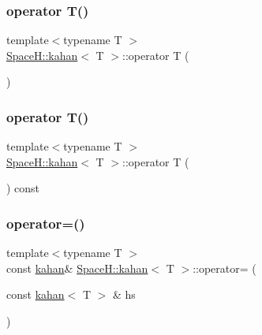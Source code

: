 \subsubsection{\texorpdfstring{operator T()}{operator T()}\hspace{0.1cm}{\footnotesize\ttfamily [1/2]}}
{\footnotesize\ttfamily template$<$typename T $>$ \\
\mbox{\hyperlink{struct_space_h_1_1kahan}{Space\+H\+::kahan}}$<$ T $>$\+::operator T (\begin{DoxyParamCaption}{ }\end{DoxyParamCaption})\hspace{0.3cm}{\ttfamily [inline]}}

\mbox{\label{struct_space_h_1_1kahan_aac0531dd242d8da70ecd34789bc29282}} 
\subsubsection{\texorpdfstring{operator T()}{operator T()}\hspace{0.1cm}{\footnotesize\ttfamily [2/2]}}
{\footnotesize\ttfamily template$<$typename T $>$ \\
\mbox{\hyperlink{struct_space_h_1_1kahan}{Space\+H\+::kahan}}$<$ T $>$\+::operator T (\begin{DoxyParamCaption}{ }\end{DoxyParamCaption}) const\hspace{0.3cm}{\ttfamily [inline]}}

\mbox{\label{struct_space_h_1_1kahan_ac37afdaf89b9767870b8b67a7e62ab4b}} 
\subsubsection{\texorpdfstring{operator=()}{operator=()}}
{\footnotesize\ttfamily template$<$typename T $>$ \\
const \mbox{\hyperlink{struct_space_h_1_1kahan}{kahan}}\& \mbox{\hyperlink{struct_space_h_1_1kahan}{Space\+H\+::kahan}}$<$ T $>$\+::operator= (\begin{DoxyParamCaption}\item[{const \mbox{\hyperlink{struct_space_h_1_1kahan}{kahan}}$<$ T $>$ \&}]{hs }\end{DoxyParamCaption})\hspace{0.3cm}{\ttfamily [inline]}}

